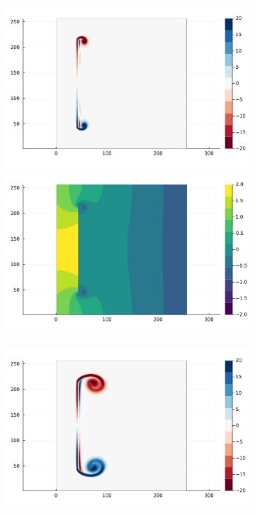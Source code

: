 \documentclass[preprint,12pt]{elsarticle}
\begin{document}
\begin{figure}
    \centering
    \begin{subfigure}{.33\textwidth}
        \centering
        \includegraphics[trim={4cm 7.2cm 5cm 1cm},clip,width=\textwidth]{tex/fig/Disk_reflect_omega_1.png}
        \includegraphics[trim={4cm 1.5cm 5cm 7cm},clip,width=\textwidth]{tex/fig/Disk_reflect_press_1.png}
    \end{subfigure}%
    \begin{subfigure}{.33\textwidth}
        \centering
        \includegraphics[trim={4cm 7.2cm 5cm 1cm},clip,width=\textwidth]{tex/fig/Disk_reflect_omega_2.png}

\end{subfigure}
\end{figure}
\end{document}
